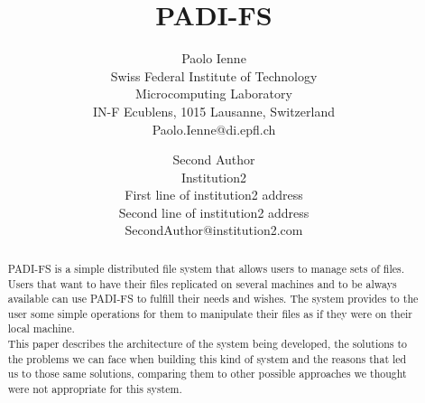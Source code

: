 \documentclass[times, 10pt,twocolumn]{article}
\begin{document}
\title{PADI-FS}

\author{Paolo Ienne\\
Swiss Federal Institute of Technology\\ Microcomputing Laboratory \\ IN-F 
Ecublens, 1015 Lausanne, Switzerland\\ Paolo.Ienne@di.epfl.ch\\
\and
Second Author\\
Institution2\\
First line of institution2 address\\ Second line of institution2 address\\ 
SecondAuthor@institution2.com\\
}

\maketitle
\thispagestyle{empty}

\begin{abstract}
   PADI-FS is a simple distributed file system that allows users to manage
   sets of files. Users that want to have their files replicated on several
   machines and to be always available can use PADI-FS to fulfill their
   needs and wishes. The system provides to the user some simple operations
   for them to manipulate their files as if they were on their local machine.\\

   This paper describes the architecture of the system being developed, the
   solutions to the problems we can face when building this kind of system
   and the reasons that led us to those same solutions, comparing them to
   other possible approaches we thought were not appropriate for this system.
\end{abstract}








\end{document}
